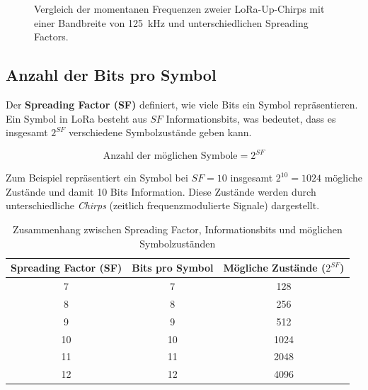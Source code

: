 	
	
	\begin{figure}[h!]
		\centering
		\caption{Vergleich der momentanen Frequenzen zweier LoRa-Up-Chirps mit einer Bandbreite von 125~kHz und unterschiedlichen Spreading Factors.}
	\end{figure}
	
\subsection{Anzahl der Bits pro Symbol}

	Der \textbf{Spreading Factor (SF)} definiert, wie viele Bits ein Symbol repräsentieren. Ein Symbol in LoRa besteht aus \( SF \) Informationsbits, was bedeutet, dass es insgesamt \( 2^{SF} \) verschiedene Symbolzustände geben kann.
	
	\[
	\text{Anzahl der möglichen Symbole} = 2^{SF}
	\]
	
	Zum Beispiel repräsentiert ein Symbol bei \( SF = 10 \) insgesamt \( 2^{10} = 1024 \) mögliche Zustände und damit 10 Bits Information. Diese Zustände werden durch unterschiedliche \textit{Chirps} (zeitlich frequenzmodulierte Signale) dargestellt.

	\begin{table}[H]
		\centering
		\caption{Zusammenhang zwischen Spreading Factor, Informationsbits und möglichen Symbolzuständen}
		\begin{tabular}{c|c|c}
			\hline
			\textbf{Spreading Factor (SF)} & \textbf{Bits pro Symbol} & \textbf{Mögliche Zustände ($2^{SF}$)} \\ \hline
			7  & 7  & 128 \\
			8  & 8  & 256 \\
			9  & 9  & 512 \\
			10 & 10 & 1024 \\
			11 & 11 & 2048 \\
			12 & 12 & 4096 \\ \hline
		\end{tabular}
	\end{table}
	
